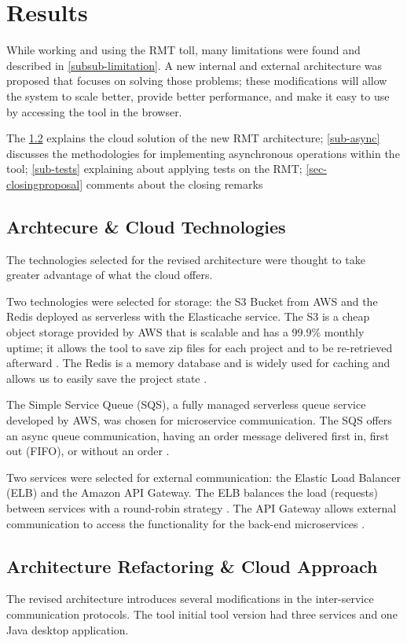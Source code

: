 \chapter{Results}

While working and using the RMT toll, many limitations were found and described in \cref{subsub-limitation}. A new internal and external architecture was proposed that focuses on solving those problems; these modifications will allow the system to scale better, provide better performance, and make it easy to use by accessing the tool in the browser.

The \cref{sec-cloud} explains the cloud solution of the new RMT architecture; \cref{sub-async} discusses the methodologies for implementing asynchronous operations within the tool; \cref{sub-tests} explaining about applying tests on the RMT; \cref{sec-closingproposal} comments about the closing remarks

\section{Archtecure \& Cloud Technologies}

The technologies selected for the revised architecture were thought to take greater advantage of what the cloud offers. 

Two technologies were selected for storage: the S3 Bucket from AWS and the Redis deployed as serverless with the Elasticache service. The S3 is a cheap object storage provided by AWS that is scalable and has a 99.9\% monthly uptime; it allows the tool to save zip files for each project and to be re-retrieved afterward \cite{S3}. The Redis is a memory database and is widely used for caching and allows us to easily save the project state \cite{Redis}.

The Simple Service Queue (SQS), a fully managed serverless queue service developed by AWS, was chosen for microservice communication. The SQS offers an async queue communication, having an order message delivered first in, first out (FIFO), or without an order \cite{sqs}.

Two services were selected for external communication: the Elastic Load Balancer (ELB) and the Amazon API Gateway. The ELB balances the load (requests) between services with a round-robin strategy \cite{Elb}. The API Gateway allows external communication to access the functionality for the back-end microservices \cite{Gateway}.

\section{Architecture Refactoring \& Cloud Approach}
\label{sec-cloud}
The revised architecture introduces several modifications in the inter-service communication protocols. The tool initial tool version had three services and one Java desktop application. 

